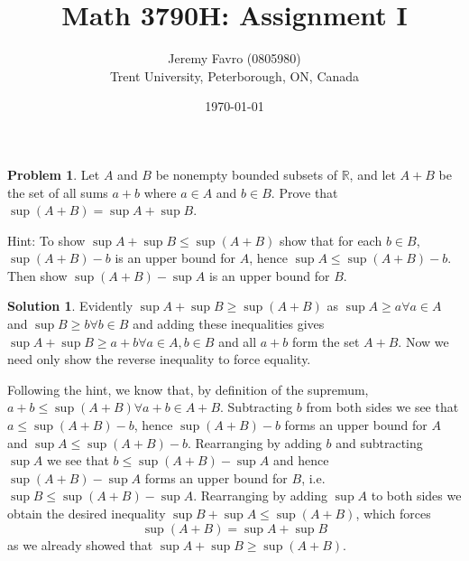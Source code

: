 \documentclass[10pt]{article}
\title{Math 3790H: Assignment I}
\author{Jeremy Favro (0805980) \\ Trent University, Peterborough, ON, Canada}
\date{\today}
\theoremstyle{definition}
\newtheorem{problem}{Problem}
\newtheorem{soln}{Solution}
\begin{document}
\maketitle

\begin{problem}
Let $A$ and $B$ be nonempty bounded subsets of $\mathbb{R}$, and let $A + B$ be the set
of all sums $a + b$ where $a \in A$ and $b \in B$. Prove that $\sup(A + B) = \sup A + \sup B$.


Hint: To show $\sup A + \sup B \leq \sup(A + B)$ show that for each $b \in B$,
$\sup(A + B) - b$ is an upper bound for $A$, hence $\sup A \leq \sup(A + B) - b$.
Then show $\sup(A + B) - \sup A$ is an upper bound for $B$.
\end{problem}
\begin{soln}
  Evidently $\sup A + \sup B \geq \sup(A+B)$ as $\sup A \geq a \forall a \in A$ and $\sup B\geq b\forall b\in B$ and adding these inequalities gives
  $\sup A + \sup B\geq a + b\forall a \in A, b \in B$ and all $a+b$ form the set $A+B$. Now we need only show the reverse inequality to force equality.


  Following the hint, we know that, by definition of the supremum, $a+b\leq \sup(A+B)\forall a+b\in A+B$. Subtracting $b$ from both sides we see that
  $a\leq \sup(A+B)-b$, hence $\sup(A+B)-b$ forms an upper bound for $A$ and $\sup A \leq \sup(A+B)-b$. Rearranging by adding $b$ and subtracting $\sup A$
  we see that $b \leq \sup(A+B)-\sup A$ and hence $\sup(A+B)-\sup A$ forms an upper bound for $B$, i.e.
  $\sup B \leq \sup(A+B)-\sup A$. Rearranging by adding $\sup A$ to both sides we obtain the desired inequality
  $\sup B +\sup A\leq \sup(A+B)$, which forces
  $$\sup(A + B) = \sup A + \sup B$$
  as we already showed that $\sup A + \sup B\geq \sup(A+B)$.
\end{soln}
\end{document}
